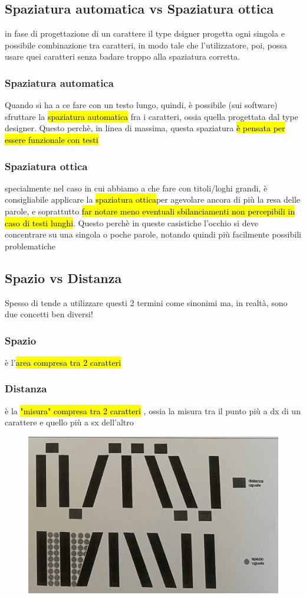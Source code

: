     \subsection{Spaziatura automatica vs Spaziatura ottica}
    in fase di progettazione di un carattere il type dsigner progetta ogni singola e possibile combinazione tra caratteri, in modo tale che l'utilizzatore, poi, possa usare quei caratteri senza badare troppo alla spaziatura corretta.
    
    
    \subsubsection{Spaziatura automatica}
    Quando si ha a ce fare con un testo lungo, quindi, è possibile (sui software) sfruttare la \hl{spaziatura automatica} fra i caratteri, ossia quella progettata dal type designer.
    Questo perchè, in linea di massima, questa spaziatura \hl{è pensata per essere funzionale con testi}
     \subsubsection{Spaziatura ottica}
     specialmente nel caso in cui abbiamo a che fare con titoli/loghi grandi, è consigliabile applicare la \hl{spaziatura ottica}per agevolare ancora di più la resa delle parole, e soprattutto \hl{far notare meno eventuali sbilanciamenti non percepibili in caso di testi lunghi}. Questo perchè in queste casistiche l'occhio si deve concentrare su una singola o poche parole, notando quindi più facilmente possibili problematiche


    \subsection{Spazio vs Distanza}
    Spesso di tende a utilizzare questi 2 termini come sinonimi ma, in realtà, sono due concetti ben diversi!
        \subsubsection{Spazio}
        è l'\hl{area compresa tra 2 caratteri}
        \subsubsection{Distanza}
        è la \hl{"misura" compresa tra 2 caratteri }, ossia la misura tra il punto più a dx di un carattere e quello più a sx dell'altro 
    \begin{figure}[H]
        \centering
        \includegraphics[width=0.2\linewidth]{lzione_4/imgs/Screenshot 2024-11-20 alle 23.42.15.png}
    \end{figure}


